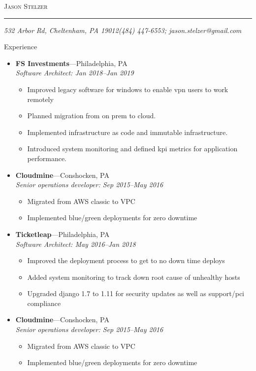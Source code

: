 \documentclass[11pt,oneside]{article}
\makeatletter
\newcommand{\name}{Jason Stelzer}
\newcommand{\addr}{532 Arbor Rd, Cheltenham, PA 19012}
\newcommand{\phone}{(484) 447-6553}
\newcommand{\email}{jason.stelzer@gmail.com}
\newcommand{\bigname}[1]{
        \begin{center}\fontfamily{phv}\selectfont\Huge\scshape#1\end{center}
}
\newenvironment{ressection}[1]{
        \vspace{4pt}
        {\fontfamily{phv}\selectfont\Large#1}
        \begin{itemize}
        \vspace{3pt}
}{
        \end{itemize}
}
\newcommand{\ressubitem}[1]{
        \vspace{-1pt}
        \item \begin{flushleft} #1 \end{flushleft}
}
\newcommand{\resbigitem}[3]{
        \vspace{-5pt}
        \item
        \textbf{#1}---#2 \\
        \textit{#3}
}
\newenvironment{ressubsec}[3]{
        \resbigitem{#1}{#2}{#3}
        \vspace{-2pt}
        \begin{itemize}
}{
        \end{itemize}
}
\makeatother
\begin{document}
 \selectfont

\bigname{\name}

\vspace{-8pt} \rule{\textwidth}{1pt}

\vspace{-1pt} {\small\itshape \addr \hfill \phone; \email}

\vspace{8 pt}

\begin{ressection}{Experience}
        \begin{ressubsec}{FS Investments}{Philadelphia, PA}{Software Architect: Jan 2018--Jan 2019}
          \ressubitem{Improved legacy software for windows to enable vpn users to work remotely }
          \ressubitem{Planned migration from on prem to cloud.}
          \ressubitem{Implemented infrastructure as code and immutable infrastructure. }
          \ressubitem{Introduced system monitoring and defined kpi metrics for application performance. }          
        \end{ressubsec}
  
        \begin{ressubsec}{Cloudmine}{Conshocken, PA}{Senior operations developer: Sep 2015--May 2016}

          \ressubitem{Migrated from AWS classic to VPC }
          \ressubitem{Implemented blue/green deployments for zero downtime }
        \end{ressubsec}
  
        \begin{ressubsec}{Ticketleap}{Philadelphia, PA}{Software Architect: May 2016--Jan 2018}
          \ressubitem{Improved the deployment process to get to no down time deploys }
          \ressubitem{Added system monitoring to track down root cause of unhealthy hosts}
          \ressubitem{Upgraded django 1.7 to 1.11 for security updates as well as support/pci compliance }
        \end{ressubsec}
  
        \begin{ressubsec}{Cloudmine}{Conshocken, PA}{Senior operations developer: Sep 2015--May 2016}

          \ressubitem{Migrated from AWS classic to VPC }
          \ressubitem{Implemented blue/green deployments for zero downtime }
        \end{ressubsec}
        

\end{ressection}
\end{document}
